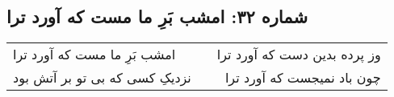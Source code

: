 \begin{center}
\section*{شماره ۳۲: امشب بَرِ ما مست که آورد ترا}
\label{sec:032}
\begin{longtable}{l p{0.5cm} r}
امشب بَرِ ما مست که آورد ترا
&&
وز پرده بدین دست که آورد ترا
\\
نزدیکِ کسی که بی تو بر آتش بود
&&
چون باد نمیجست که آورد ترا
\\
\end{longtable}
\end{center}
